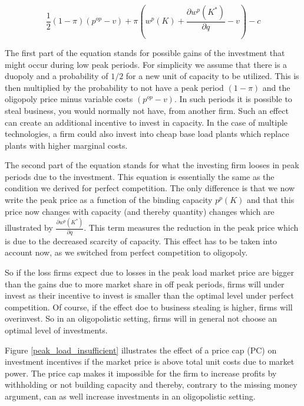 \begin{equation*}
	\frac{1}{2} (1-\pi) (p^{op}-v) + \pi \left(w^p(K)+\frac{\partial w^p(K^*)}{\partial q}-v\right) - c
\end{equation*}

The first part of the equation stands for possible gains of the investment that might occur during low peak periods. For simplicity we assume that there is a duopoly and a probability of $1/2$ for a new unit of capacity to be utilized. This is then multiplied by the probability to not have a peak period $(1-\pi)$ and the oligopoly price minus variable costs $(p^{op}-v)$. In such periods it is possible to steal business, you would normally not have, from another firm. Such an effect can create an additional incentive to invest in capacity. In the case of multiple technologies, a firm could also invest into cheap base load plants which replace plants with higher marginal costs. %

The second part of the equation stands for what the investing firm looses in peak periods due to the investment. This equation is essentially the same as the condition we derived for perfect competition. The only difference is that we now write the peak price as a function of the binding capacity $p^p(K)$ and that this price now changes with capacity (and thereby quantity) changes which are illustrated by $\frac{\partial w^p(K^*)}{\partial q}$. This term measures the reduction in the peak price which is due to the decreased scarcity of capacity. This effect has to be taken into account now, as we switched from perfect competition to oligopoly.

So if the loss firms expect due to losses in the peak load market price are bigger than the gains due to more market share in off peak periods, firms will under invest as their incentive to invest is smaller than the optimal level under perfect competition. Of course, if the effect doe to business stealing is higher, firms will overinvest. So in an oligopolistic setting, firms will in general not choose an optimal level of investments.

Figure \ref{peak_load_insufficient} illustrates the effect of a price cap (PC) on investment incentives if the market price is above total unit costs due to market power. The price cap makes it impossible for the firm to increase profits by withholding or not building capacity and thereby, contrary to the missing money argument, can as well increase investments in an oligopolistic setting.

